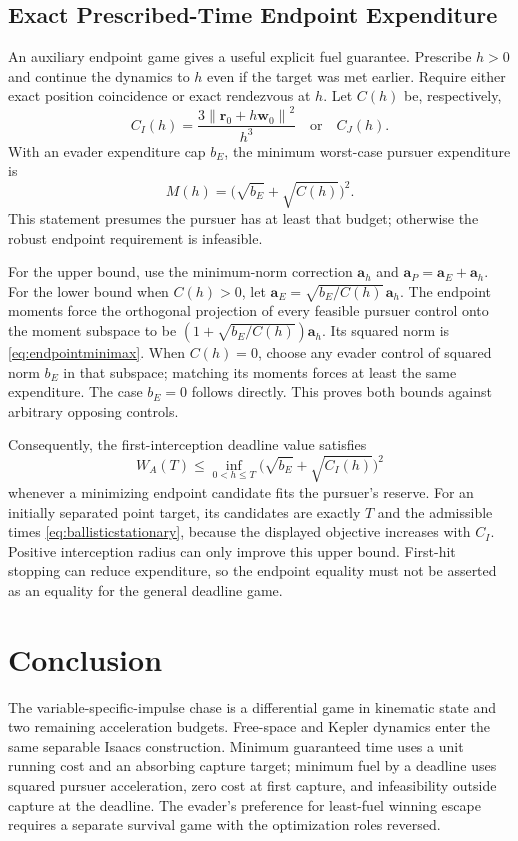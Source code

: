 \documentclass[journal,a4paper]{IEEEtran}
\newcommand{\norm}[1]{\left\|#1\right\|}
\begin{document}
\subsection{Exact Prescribed-Time Endpoint Expenditure}
An auxiliary endpoint game gives a useful explicit fuel guarantee. Prescribe $h>0$ and continue the dynamics to $h$ even if the target was met earlier. Require either exact position coincidence or exact rendezvous at $h$. Let $C(h)$ be, respectively,
\begin{equation}
 C_I(h)=\frac{3\norm{\mathbf r_0+h\mathbf w_0}^2}{h^3}
 \quad\text{or}\quad C_J(h).
\end{equation}
With an evader expenditure cap $b_E$, the minimum worst-case pursuer expenditure is
\begin{equation}
 \boxed{M(h)=\bigl(\sqrt{b_E}+\sqrt{C(h)}\bigr)^2.}
 \label{eq:endpointminimax}
\end{equation}
This statement presumes the pursuer has at least that budget; otherwise the robust endpoint requirement is infeasible.

For the upper bound, use the minimum-norm correction $\mathbf a_h$ and $\mathbf a_P=\mathbf a_E+\mathbf a_h$. For the lower bound when $C(h)>0$, let $\mathbf a_E=\sqrt{b_E/C(h)}\,\mathbf a_h$. The endpoint moments force the orthogonal projection of every feasible pursuer control onto the moment subspace to be $(1+\sqrt{b_E/C(h)})\mathbf a_h$. Its squared norm is \eqref{eq:endpointminimax}. When $C(h)=0$, choose any evader control of squared norm $b_E$ in that subspace; matching its moments forces at least the same expenditure. The case $b_E=0$ follows directly. This proves both bounds against arbitrary opposing controls.

Consequently, the first-interception deadline value satisfies
\begin{equation}
 W_A(T)\le\inf_{0<h\le T}
       \bigl(\sqrt{b_E}+\sqrt{C_I(h)}\bigr)^2
 \label{eq:deadlineupperexplicit}
\end{equation}
whenever a minimizing endpoint candidate fits the pursuer's reserve. For an initially separated point target, its candidates are exactly $T$ and the admissible times \eqref{eq:ballisticstationary}, because the displayed objective increases with $C_I$. Positive interception radius can only improve this upper bound. First-hit stopping can reduce expenditure, so the endpoint equality must not be asserted as an equality for the general deadline game.

\section{Conclusion}
The variable-specific-impulse chase is a differential game in kinematic state and two remaining acceleration budgets. Free-space and Kepler dynamics enter the same separable Isaacs construction. Minimum guaranteed time uses a unit running cost and an absorbing capture target; minimum fuel by a deadline uses squared pursuer acceleration, zero cost at first capture, and infeasibility outside capture at the deadline. The evader's preference for least-fuel winning escape requires a separate survival game with the optimization roles reversed.
\end{document}
